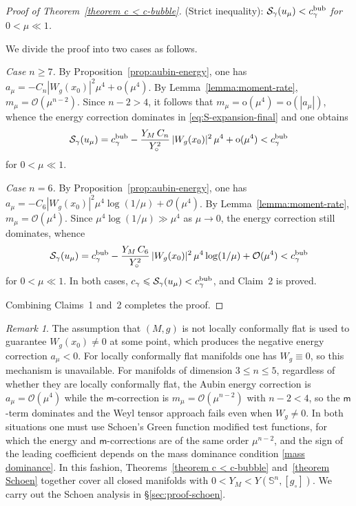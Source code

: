 \documentclass[reqno,11pt]{amsart}
\numberwithin{equation}{section}
\theoremstyle{definition}
\theoremstyle{remark}
\newtheorem{remark}[theorem]{Remark}
\newcommand{\Ss}{\mathbb{S}}
\begin{document}
\begin{proof}[Proof of Theorem~\ref{theorem c < c-bubble}]
\medskip
{} {\rm (Strict inequality):} {\it $\mathcal{S}_\gamma(u_\mu) < c_\gamma^{\rm bub}$ for $0 < \mu \ll 1$.}

\smallskip
{} We divide the proof into two cases as follows.

\noindent \textit{Case $n \geqslant 7$.}
By Proposition~\ref{prop:aubin-energy}, one has $a_\mu = -C_n |W_g(x_0)|^2 \mu^4 + \mathrm{o}(\mu^4)$. By Lemma~\ref{lemma:moment-rate}, $m_\mu = \mathcal{O}(\mu^{n-2})$. Since $n - 2 >4$, it follows that $m_\mu = \mathrm{o}(\mu^4) = \mathrm{o}(|a_\mu|)$, whence the energy correction dominates in \eqref{eq:S-expansion-final} and one obtains
\[
\mathcal{S}_\gamma(u_\mu) = c_\gamma^{\rm bub} - \frac{Y_M\, C_n}{Y_\circ^2}\, |W_g(x_0)|^2\, \mu^4 + \mathrm{o}(\mu^4) < c_\gamma^{\rm bub}
\]
for $0 < \mu \ll 1$.

\smallskip
\noindent\textit{Case $n = 6$.}
By Proposition~\ref{prop:aubin-energy}, one has $a_\mu = -C_6 |W_g(x_0)|^2 \mu^4 \log(1/\mu) + \mathcal{O}(\mu^4)$. By Lemma~\ref{lemma:moment-rate}, $m_\mu = \mathcal{O}(\mu^4)$. Since $\mu^4 \log(1/\mu) \gg \mu^4$ as $\mu \to 0$, the energy correction still dominates, whence
\[
\mathcal{S}_\gamma(u_\mu) = c_\gamma^{\rm bub} - \frac{Y_M\, C_6}{Y_\circ^2}\, |W_g(x_0)|^2\, \mu^4 \log(1/\mu) + \mathcal{O}(\mu^4) < c_\gamma^{\rm bub}
\]
for $0 < \mu \ll 1$.
In both cases, $c_\gamma \leqslant \mathcal{S}_\gamma(u_\mu) < c_\gamma^{\rm bub}$, and Claim~2 is proved.

\medskip
Combining Claims~1 and~2 completes the proof.
\end{proof}

\begin{remark}
\label{rmk:lcf-and-low-dim}
The assumption that $(M,g)$ is not locally conformally flat is used to guarantee $W_g(x_0) \neq 0$ at some point, which produces the negative energy correction $a_\mu < 0$. For locally conformally flat manifolds one has $W_g \equiv 0$, so this mechanism is unavailable. For manifolds of dimension $3 \leqslant n \leqslant 5$, regardless of whether they are locally conformally flat, the Aubin energy correction is $a_\mu = \mathcal{O}(\mu^4)$ while the $\mathsf{m}$-correction is $m_\mu = \mathcal{O}(\mu^{n-2})$ with $n - 2 <4$, so the $\mathsf{m}$-term dominates and the Weyl tensor approach fails even when $W_g \neq 0$. In both situations one must use Schoen's Green function modified test functions, for which the energy and $\mathsf{m}$-corrections are of the same order $\mu^{n-2}$, and the sign of the leading coefficient depends on the mass dominance condition \eqref{mass dominance}. In this fashion, Theorems~\ref{theorem c < c-bubble} and~\ref{theorem Schoen} together cover all closed manifolds with $0 < Y_M < Y(\Ss^n, [g_\circ])$. We carry out the Schoen analysis in \S\ref{sec:proof-schoen}.
\end{remark}
\end{document}
